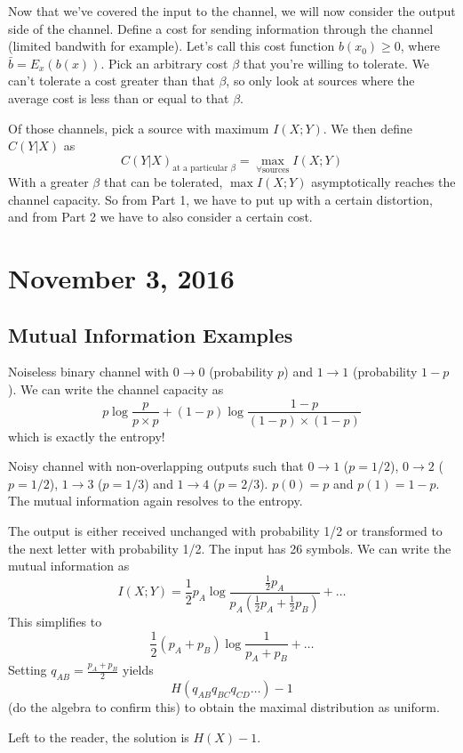\documentclass[11pt]{article}
\theoremstyle{definition}
\begin{document}
Now that we've covered the input to the channel, we will now consider the output side of the channel. Define a cost for sending information through the channel (limited bandwith for example). Let's call this cost function $b(x_0) \geq 0$, where $\bar{b} = E_x(b(x))$. Pick an arbitrary cost $\beta$ that you're willing to tolerate. We can't tolerate a cost greater than that $\beta$, so only look at sources where the average cost is less than or equal to that $\beta$. 

Of those channels, pick a source with maximum $I(X;Y)$. We then define $C(Y|X)$ as $$C(Y|X)_{\text{at a particular } \beta} = \max_{\forall \text{sources}} I(X;Y)$$
With a greater $\beta$ that can be tolerated, $\max I(X;Y)$ asymptotically reaches the channel capacity. So from Part 1, we have to put up with a certain distortion, and from Part 2 we have to also consider a certain cost. 
\section{November 3, 2016}

\subsection{Mutual Information Examples}

\example Noiseless binary channel with $0 \rightarrow 0$ (probability $p$) and $1 \rightarrow 1$ (probability $1-p$). We can write the channel capacity as $$p \log \frac{p}{p \times p} + (1-p) \log \frac{1-p}{(1-p) \times (1-p)}$$which is exactly the entropy!

\example Noisy channel with non-overlapping outputs such that $0 \rightarrow 1$ ($p = 1/2$), $0 \rightarrow 2$ ($p = 1/2$), $1 \rightarrow 3$ ($p = 1/3$) and $1 \rightarrow 4$ ($p = 2/3$). $p(0) = p$ and $p(1) = 1-p$. The mutual information again resolves to the entropy.

 The output is either received unchanged with probability 1/2 or transformed to the next letter with probability 1/2. The input has 26 symbols. We can write the mutual information as $$I(X;Y) = \frac{1}{2} p_A \log \frac{\frac{1}{2}p_A}{p_A\left(\frac{1}{2}p_A + \frac{1}{2}p_B\right)} + \dots $$This simplifies to $$\frac{1}{2}(p_A + p_B) \log \frac{1}{p_A + p_B} + \dots $$Setting $q_{AB} = \frac{p_A + p_B}{2}$ yields $$H(q_{AB}q_{BC}q_{CD}\dots) - 1$$(do the algebra to confirm this) to obtain the maximal distribution as uniform.

 Left to the reader, the solution is $H(X) - 1$.
\end{document}
